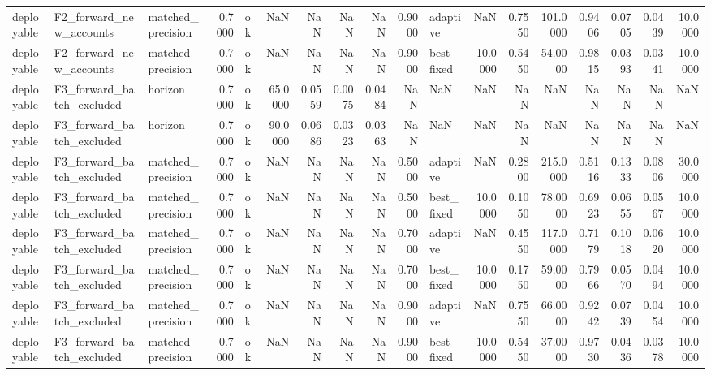 \begin{table}
\begin{tabular}{lllrlrrrrrlrrrrrrr}
deployable & F2\_forward\_new\_accounts & matched\_precision & 0.7000 & ok & NaN & NaN & NaN & NaN & 0.9000 & adaptive & NaN & 0.7550 & 101.0000 & 0.9406 & 0.0705 & 0.0439 & 10.0000 \\
deployable & F2\_forward\_new\_accounts & matched\_precision & 0.7000 & ok & NaN & NaN & NaN & NaN & 0.9000 & best\_fixed & 10.0000 & 0.5450 & 54.0000 & 0.9815 & 0.0393 & 0.0341 & 10.0000 \\
deployable & F3\_forward\_batch\_excluded & horizon & 0.7000 & ok & 65.0000 & 0.0559 & 0.0075 & 0.0484 & NaN & NaN & NaN & NaN & NaN & NaN & NaN & NaN & NaN \\
deployable & F3\_forward\_batch\_excluded & horizon & 0.7000 & ok & 90.0000 & 0.0686 & 0.0323 & 0.0363 & NaN & NaN & NaN & NaN & NaN & NaN & NaN & NaN & NaN \\
deployable & F3\_forward\_batch\_excluded & matched\_precision & 0.7000 & ok & NaN & NaN & NaN & NaN & 0.5000 & adaptive & NaN & 0.2800 & 215.0000 & 0.5116 & 0.1333 & 0.0806 & 30.0000 \\
deployable & F3\_forward\_batch\_excluded & matched\_precision & 0.7000 & ok & NaN & NaN & NaN & NaN & 0.5000 & best\_fixed & 10.0000 & 0.1050 & 78.0000 & 0.6923 & 0.0655 & 0.0567 & 10.0000 \\
deployable & F3\_forward\_batch\_excluded & matched\_precision & 0.7000 & ok & NaN & NaN & NaN & NaN & 0.7000 & adaptive & NaN & 0.4550 & 117.0000 & 0.7179 & 0.1018 & 0.0620 & 10.0000 \\
deployable & F3\_forward\_batch\_excluded & matched\_precision & 0.7000 & ok & NaN & NaN & NaN & NaN & 0.7000 & best\_fixed & 10.0000 & 0.1750 & 59.0000 & 0.7966 & 0.0570 & 0.0494 & 10.0000 \\
deployable & F3\_forward\_batch\_excluded & matched\_precision & 0.7000 & ok & NaN & NaN & NaN & NaN & 0.9000 & adaptive & NaN & 0.7550 & 66.0000 & 0.9242 & 0.0739 & 0.0454 & 10.0000 \\
deployable & F3\_forward\_batch\_excluded & matched\_precision & 0.7000 & ok & NaN & NaN & NaN & NaN & 0.9000 & best\_fixed & 10.0000 & 0.5450 & 37.0000 & 0.9730 & 0.0436 & 0.0378 & 10.0000 \\
\bottomrule
\end{tabular}
\end{table}
